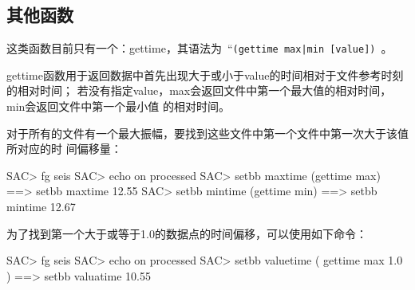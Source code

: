 \subsection{其他函数}
这类函数目前只有一个：gettime，其语法为~``\lstinline{(gettime max|min [value])}~。

gettime函数用于返回数据中首先出现大于或小于value的时间相对于文件参考时刻的相对时间；
若没有指定value，max会返回文件中第一个最大值的相对时间，min会返回文件中第一个最小值
的相对时间。

对于所有的文件有一个最大振幅，要找到这些文件中第一个文件中第一次大于该值所对应的时
间偏移量：
\begin{SACCode}
SAC> fg seis
SAC> echo on processed
SAC> setbb maxtime (gettime max)
 ==>  setbb maxtime 12.55
SAC> setbb mintime (gettime min)
 ==>  setbb mintime 12.67
\end{SACCode}

为了找到第一个大于或等于1.0的数据点的时间偏移，可以使用如下命令：
\begin{SACCode}
SAC> fg seis
SAC> echo on processed
SAC> setbb valuetime ( gettime max 1.0 )
 ==> setbb valuatime 10.55
\end{SACCode}
